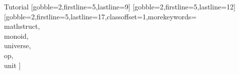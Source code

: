 \documentclass{stex}
\begin{document}
  \begin{sfragment}{Tutorial}
    [gobble=2,firstline=5,lastline=9]
    [gobble=2,firstline=5,lastline=12]
    [gobble=2,firstline=5,lastline=17,classoffset=1,morekeywords={
    \\mathstruct,\\monoid,\\universe,\\op,\\unit
    }]
  \end{sfragment}
  
\end{document}
